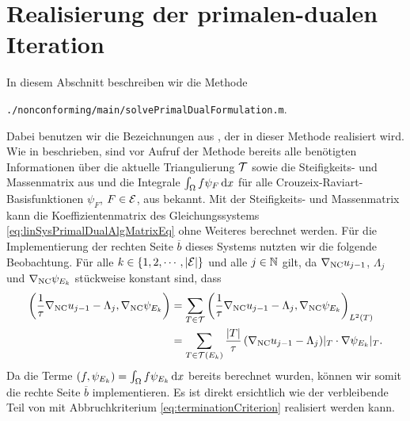 \section{Realisierung der primalen-dualen Iteration}
\label{sec:implementationPrimalDualIteration}
In diesem Abschnitt beschreiben wir die Methode
\begin{center}
  \texttt{./nonconforming/main/solvePrimalDualFormulation.m}.
\end{center}
Dabei benutzen wir die Bezeichnungen aus , der
in dieser Methode realisiert wird.
Wie in  beschrieben, sind vor Aufruf der Methode bereits
alle benötigten Informationen über die aktuelle Triangulierung $\mathcal{T}$ sowie
die Steifig\-keits- und Massenmatrix aus 
und die Integrale $\int_\Omega f\psi_F\,\mathrm{d}x$ für alle
Crouzeix-Raviart-Basisfunktionen $\psi_F$, $F\in\mathcal{E}$, aus
 bekannt.
Mit der Steifigkeits- und Massenmatrix kann die Koeffizientenmatrix des
Gleichungssystems \eqref{eq:linSysPrimalDualAlgMatrixEq} ohne Weiteres
berechnet werden.
Für die Implementierung der rechten Seite $\overline b$ dieses Systems nutzten
wir die folgende Beobachtung.
Für alle $k\in\{1,2,\cdots,|\mathcal{E}|\}$ und alle $j\in\mathbb{N}$ gilt, da $\nabla_\textup{NC}
u_{j-1}$, $\Lambda_j$ und $\nabla_\textup{NC} \psi_{E_k}$ stückweise konstant sind, dass
\begin{align*}
  \left(\frac{1}{\tau}\nabla_\textup{NC} u_{j-1}-\Lambda_j,\nabla_\textup{NC}\psi_{E_k}\right)
  &=
  \sum_{T\in\mathcal{T}}
  \left(\frac{1}{\tau}\nabla_\textup{NC} u_{j-1}-\Lambda_j,
  \nabla_\textup{NC}\psi_{E_k}\right)_{L^2(T)}\\
  &=
  \sum_{T\in\mathcal{T}(E_k)}
  \frac{|T|}{\tau}\left(\nabla_\textup{NC} u_{j-1}-\Lambda_j\right)\!|_T\cdot
  \nabla\psi_{E_k}|_T.
\end{align*}
Da die Terme $\left(f,\psi_{E_k}\right)=\int_\Omega f\psi_{E_k}\,\mathrm{d}x$ bereits
berechnet wurden, können wir somit die rechte Seite $\overline b$
implementieren.
Es ist direkt ersichtlich wie der verbleibende Teil von
 mit Abbruchkriterium
\eqref{eq:terminationCriterion} realisiert werden kann.

